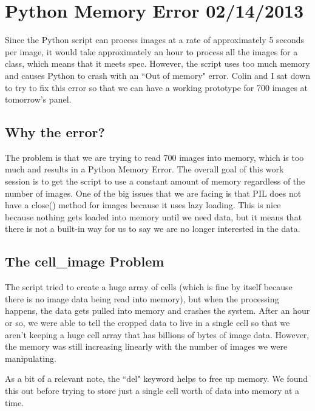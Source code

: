 \documentclass[]{article}
\begin{document}
	\tableofcontents
	\newpage
	\setcounter{page}{1}
	\thispagestyle{empty}
	
	
	\setlength{\parindent}{0pt}
	\setlength{\parskip}{6pt}
	
	\section{Python Memory Error 02/14/2013}
		Since the Python script can process images at a rate of approximately 5 seconds per image, it would take approximately an hour to process all the images for a class, which means that it meets spec. However, the script uses too much memory and causes Python to crash with an ``Out of memory" error. Colin and I sat down to try to fix this error so that we can have a working prototype for 700 images at tomorrow's panel. 
		
		\subsection{Why the error?}
			The problem is that we are trying to read 700 images into memory, which is too much and results in a Python Memory Error. The overall goal of this work session is to get the script to use a constant amount of memory regardless of the number of images. One of the big issues that we are facing is that PIL does not have a close() method for images because it uses lazy loading. This is nice because nothing gets loaded into memory until we need data, but it means that there is not a built-in way for us to say we are no longer interested in the data.
			
		\subsection{The cell\_image Problem}
			The script tried to create a huge array of cells (which is fine by itself because there is no image data being read into memory), but when the processing happens, the data gets pulled into memory and crashes the system. After an hour or so, we were able to tell the cropped data to live in a single cell so that we aren't keeping a huge cell array that has billions of bytes of image data. However, the memory was still increasing linearly with the number of images we were manipulating.
			
			As a bit of a relevant note, the ``del" keyword helps to free up memory. We found this out before trying to store just a single cell worth of data into memory at a time.
			
\end{document}
